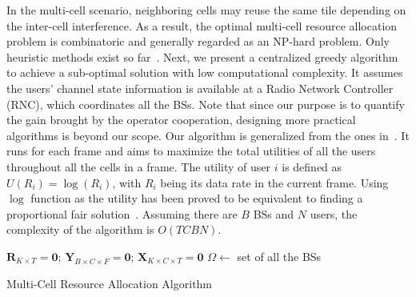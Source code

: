 \documentclass[conference]{IEEEtran}
\begin{document}
In the multi-cell scenario, neighboring cells may reuse the same tile depending on the inter-cell interference. As a result, the optimal multi-cell resource allocation problem is combinatoric and generally regarded as an NP-hard problem. Only heuristic methods exist so far~\cite{Koutsopoulos@TON06}\cite{Guoqing@TWC06}\cite{Honghai@JSAC11}. Next, we present a centralized greedy algorithm to achieve a sub-optimal solution with low computational complexity. It assumes the users' channel state information is available at a Radio Network Controller (RNC), which coordinates all the BSs. Note that since our purpose is to quantify the gain brought by the operator cooperation, designing more practical algorithms is beyond our scope. Our algorithm is generalized from the ones in~\cite{Koutsopoulos@TON06}\cite{Guoqing@TWC06}. It runs for each frame and aims to maximize the total utilities of all the users throughout all the cells in a frame. The utility of user $i$ is defined as $U(R_i) = \log(R_i)$, with $R_i$ being its data rate in the current frame. Using $\log$ function as the utility has been proved to be equivalent to finding a proportional fair solution~\cite{Kelly@Fair98}. Assuming there are $B$ BSs and $N$ users, the complexity of the algorithm is $O(TCBN)$.
\vspace{-0.1in}
\begin{algorithm}
\small {
$\mathbf{R}_{K \times T} = \mathbf{0}$; $\mathbf{Y}_{B \times C \times F} = \mathbf{0}$; $\mathbf{X}_{K \times C \times T} = \mathbf{0}$\;
 {
     {
        $\Omega \leftarrow$ set of all the BSs\;
    }
}
}
\label{alg:1}
\caption{Multi-Cell Resource Allocation Algorithm}
\end{algorithm}
\vspace{-0.1in}
\end{document}
